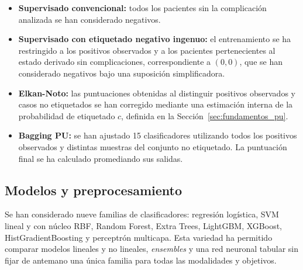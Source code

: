 \begin{itemize}
    \item \textbf{Supervisado convencional:} todos los pacientes sin la complicación analizada se han considerado negativos.


    \item \textbf{Supervisado con etiquetado negativo ingenuo:} el entrenamiento se ha restringido a los positivos observados y a los pacientes pertenecientes al estado derivado sin complicaciones, correspondiente a \((0,0)\), que se han considerado negativos bajo una suposición simplificadora.


    \item \textbf{Elkan-Noto:} las puntuaciones obtenidas al distinguir positivos observados y casos no etiquetados se han corregido mediante una estimación interna de la probabilidad de etiquetado \(c\), definida en la Sección~\ref{sec:fundamentos_pu}.

    \item \textbf{Bagging PU:} se han ajustado 15 clasificadores utilizando todos los positivos observados y distintas muestras del conjunto no etiquetado. La puntuación final se ha calculado promediando sus salidas.
\end{itemize}


\subsection{Modelos y preprocesamiento}

Se han considerado nueve familias de clasificadores: regresión logística, SVM lineal y con núcleo RBF, Random Forest, Extra Trees, LightGBM, XGBoost, HistGradientBoosting y perceptrón multicapa. Esta variedad ha permitido comparar modelos lineales y no lineales, \textit{ensembles} y una red neuronal tabular sin fijar de antemano una única familia para todas las modalidades y objetivos.

